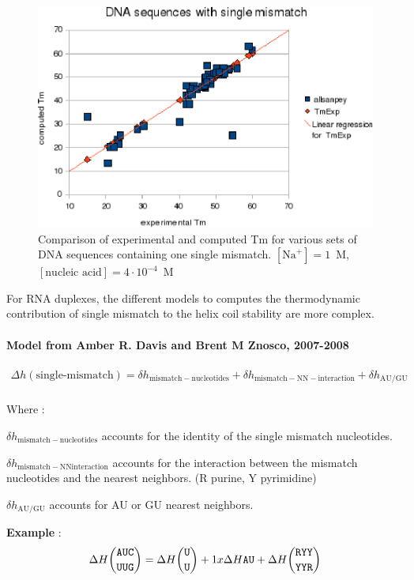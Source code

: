 \documentclass{article}
\begin{document}
\begin{figure}[h]
\includegraphics{images/DNASingleMismatch.eps}
\caption{Comparison of experimental and computed Tm for various sets of
 DNA sequences containing one single mismatch. $[\mbox{Na}^+] = 1$~M, $[\mbox{nucleic acid}] = 4\cdot{}10^{-4}$~M}
\end{figure}

For RNA duplexes, the different models to computes the thermodynamic contribution of single mismatch to the helix coil 
stability are more complex.


\paragraph{\textbf{Model from Amber R. Davis and Brent M Znosco, 2007-2008}}

\begin{multline*}
\Delta h {(\mbox{single-mismatch})} = 
\delta{}h_\mathrm{mismatch-nucleotides} +
\delta{}h_\mathrm{mismatch-NN-interaction} +
\delta{}h_\mathrm{AU/GU} \\
\end{multline*}

Where :

$\delta{}h_\mathrm{mismatch-nucleotides}$ accounts for the identity of the single mismatch nucleotides.

$\delta{}h_\mathrm{mismatch-NN interaction}$ accounts for the interaction between the mismatch nucleotides and 
the nearest neighbors. (R purine, Y pyrimidine)

$\delta{}h_\mathrm{AU/GU}$ accounts for AU or GU nearest neighbors.

\textbf{Example} :
\begin{multline*}
\Delta H {\mbox{\texttt{AUC}} \choose \mbox{\texttt{UUG}}} = 
\Delta H {\mbox{\texttt{U}} \choose \mbox{\texttt{U}} } + 
1 x \Delta H {\mbox{\texttt{AU}} } +
\Delta H {\mbox{\texttt{RYY}} \choose \mbox{\texttt{YYR}} } \\
\end{multline*}
\end{document}
